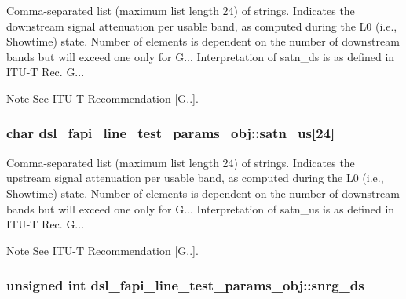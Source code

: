 Comma-\/separated list (maximum list length 24) of strings. Indicates the downstream signal attenuation per usable band, as computed during the L0 (i.\-e., Showtime) state. Number of elements is dependent on the number of downstream bands but will exceed one only for G... Interpretation of satn\-\_\-ds is as defined in I\-T\-U-\/\-T Rec. G... \begin{DoxyNote}{Note}
See I\-T\-U-\/\-T Recommendation \mbox{[}G..\mbox{]}. 
\end{DoxyNote}
\hypertarget{structdsl__fapi__line__test__params__obj_a6445be0f67ecc319197734403e442b76}{
\subsubsection[{satn\-\_\-us}]{\setlength{\rightskip}{0pt plus 5cm}char dsl\-\_\-fapi\-\_\-line\-\_\-test\-\_\-params\-\_\-obj\-::satn\-\_\-us\mbox{[}24\mbox{]}}}\label{structdsl__fapi__line__test__params__obj_a6445be0f67ecc319197734403e442b76}
Comma-\/separated list (maximum list length 24) of strings. Indicates the upstream signal attenuation per usable band, as computed during the L0 (i.\-e., Showtime) state. Number of elements is dependent on the number of downstream bands but will exceed one only for G... Interpretation of satn\-\_\-us is as defined in I\-T\-U-\/\-T Rec. G... \begin{DoxyNote}{Note}
See I\-T\-U-\/\-T Recommendation \mbox{[}G..\mbox{]}. 
\end{DoxyNote}
\hypertarget{structdsl__fapi__line__test__params__obj_a6bc1ac31ab8f8c3f7d2b7734b176b920}{
\subsubsection[{snrg\-\_\-ds}]{\setlength{\rightskip}{0pt plus 5cm}unsigned int dsl\-\_\-fapi\-\_\-line\-\_\-test\-\_\-params\-\_\-obj\-::snrg\-\_\-ds}}\label{structdsl__fapi__line__test__params__obj_a6bc1ac31ab8f8c3f7d2b7734b176b920}
